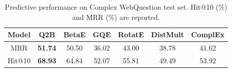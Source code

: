 \begin{table}[t]
\centering
\caption{Predictive performance on Complex WebQuestion test set. Hit@10 (\%) and MRR (\%) are reported. \label{tab:kgqa} }
\begin{tabular}{ccccccc}
	\toprule
Model & Q2B & BetaE & GQE & RotatE & DistMult & ComplEx \\
\hline
MRR & {\bf 51.74} & 50.50 & 36.02 & 43.00 & 38.78 & 41.62\\
Hit@10 & {\bf 68.93} & 64.84 & 52.07 & 55.81 & 49.49 & 53.92 \\
	\bottomrule
\end{tabular}
\end{table}
